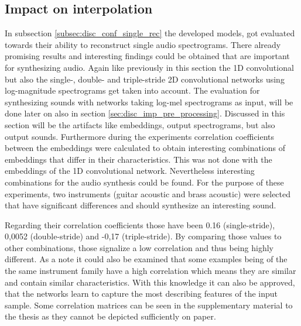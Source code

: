\subsection{Impact on interpolation}
\label{subsec:disc_conf_inter}
In subsection \ref{subsec:disc_conf_single_rec} the developed models, got evaluated towards their ability to reconstruct single audio spectrograms. There already promising results and interesting findings could be obtained that are important for synthesizing audio. Again like previously in this section the 1D convolutional but also the single-, double- and triple-stride 2D convolutional networks using log-magnitude spectrograms get taken into account. The evaluation for synthesizing sounds with networks taking log-mel spectrograms as input, will be done later on also in section \ref{sec:disc_imp_pre_processing}. Discussed in this section will be the artifacts like embeddings, output spectrograms, but also output sounds. Furthermore during the experiments correlation coefficients between the embeddings were calculated to obtain interesting combinations of embeddings that differ in their characteristics. This was not done with the embeddings of the 1D convolutional network. Nevertheless interesting combinations for the audio synthesis could be found. For the purpose of these experiments, two instruments (guitar acoustic and brass acoustic) were selected that have significant differences and should synthesize an interesting sound. 

Regarding their correlation coefficients those have been 0.16 (single-stride), 0,0052 (double-stride) and -0,17 (triple-stride). By comparing those values to other combinations, those signalize a low correlation and thus being highly different. As a note it could also be examined that some examples being of the the same instrument family have a high correlation which means they are similar and contain similar characteristics. With this knowledge it can also be approved, that the networks learn to capture the most describing features of the input sample. Some correlation matrices can be seen in the supplementary material to the thesis as they cannot be depicted sufficiently on paper.


